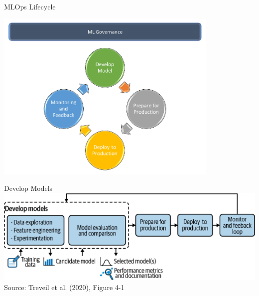 \documentclass[ignorenonframetext,xcolor=x11names]{beamer}
\begin{document}
\begin{frame}{MLOps Lifecycle}
\centering

\includegraphics[height=3.25in]{graphics2.png} \\
\end{frame}


\begin{frame}{Develop Models}
\centering
\includegraphics[width=\textwidth]{imlo_0401.png} \\

\vspace{\baselineskip}
\scriptsize Source: Treveil et al. (2020), Figure 4-1
\end{frame}
\end{document}
